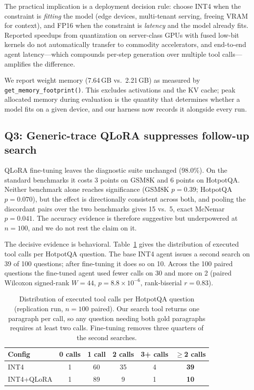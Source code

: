 \documentclass{article}
\begin{document}
The practical implication is a deployment decision rule: choose INT4 when
the constraint is \emph{fitting} the model (edge devices, multi-tenant
serving, freeing VRAM for context), and FP16 when the constraint is
\emph{latency} and the model already fits. Reported speedups from
quantization on server-class GPUs with fused low-bit kernels do not
automatically transfer to commodity accelerators, and end-to-end agent
latency---which compounds per-step generation over multiple tool
calls---amplifies the difference.

We report weight memory (7.64\,GB vs.\ 2.21\,GB) as measured by
\texttt{get\_memory\_footprint()}. This excludes activations and the KV
cache; peak allocated memory during evaluation is the quantity that
determines whether a model fits on a given device, and our harness now
records it alongside every run.

\subsection{Q3: Generic-trace QLoRA suppresses follow-up search}
\label{sec:q3}

QLoRA fine-tuning leaves the diagnostic suite unchanged (98.0\%). On the
standard benchmarks it costs 3 points on GSM8K and 6 points on HotpotQA.
Neither benchmark alone reaches significance (GSM8K $p{=}0.39$; HotpotQA
$p{=}0.070$), but the effect is directionally consistent across both, and
pooling the discordant pairs over the two benchmarks gives 15 vs.\ 5,
exact McNemar $p{=}0.041$. The accuracy evidence is therefore suggestive
but underpowered at $n{=}100$, and we do not rest the claim on it.

The decisive evidence is behavioral. Table~\ref{tab:depth} gives the
distribution of executed tool calls per HotpotQA question. The base INT4
agent issues a second search on 39 of 100 questions; after fine-tuning it
does so on 10. Across the 100 paired questions the fine-tuned agent used
fewer calls on 30 and more on 2 (paired Wilcoxon signed-rank
$W{=}44$, $p{=}8.8\times10^{-6}$, rank-biserial $r{=}0.83$).

\begin{table}[t]
\centering
\caption{Distribution of executed tool calls per HotpotQA question
(replication run, $n{=}100$ paired). Our search tool returns one paragraph
per call, so any question needing both gold paragraphs requires at least two
calls. Fine-tuning removes three quarters of the second searches.}
\label{tab:depth}
\small
\begin{tabular}{lccccc}
\toprule
Config & 0 calls & 1 call & 2 calls & 3+ calls & $\ge$2 calls \\
\midrule
INT4          & 1 & 60 & 35 & 4 & \textbf{39} \\
INT4+QLoRA    & 1 & 89 &  9 & 1 & \textbf{10} \\
\bottomrule
\end{tabular}
\end{table}
\end{document}
